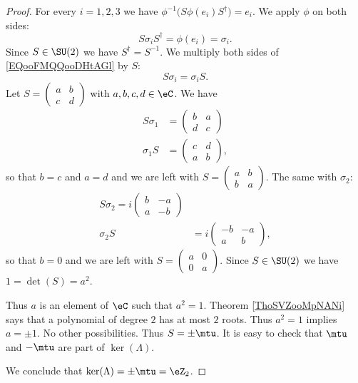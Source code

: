 \begin{proof}
	For every \( i=1,2,3\) we have \( \phi^{-1}\big( S\phi(e_i)S^{\dag} \big)=e_i\). We apply \( \phi\) on both sides:
	\begin{equation}        \label{EQooFMQQooDHtAGl}
		S\sigma_iS^{\dag}=\phi(e_i)=\sigma_i.
	\end{equation}
	Since \( S\in \SU(2)\) we have \( S^{\dag}=S^{-1}\). We multiply both sides of \eqref{EQooFMQQooDHtAGl} by \( S\):
	\begin{equation}
		S\sigma_i=\sigma_iS.
	\end{equation}
	Let \( S=\begin{pmatrix}
		a & b \\
		c & d
	\end{pmatrix}\) with \( a,b,c,d\in \eC\). We have
	\begin{subequations}
		\begin{align}
			S\sigma_1 & =\begin{pmatrix}
				             b & a \\
				             d & c
			             \end{pmatrix} \\
			\sigma_1S & =\begin{pmatrix}
				             c & d \\
				             a & b
			             \end{pmatrix},
		\end{align}
	\end{subequations}
	so that \( b=c\) and \( a=d\) and we are left with \( S=\begin{pmatrix}
		a & b \\
		b & a
	\end{pmatrix}\). The same with \( \sigma_2\):
	\begin{subequations}
		\begin{align}
			S\sigma_2=i\begin{pmatrix}
				           b & -a \\
				           a & -b
			           \end{pmatrix}    \\
			\sigma_2S & =i\begin{pmatrix}
				              -b & -a \\
				              a  & b
			              \end{pmatrix},
		\end{align}
	\end{subequations}
	so that \( b=0\) and we are left with \( S=\begin{pmatrix}
		a & 0 \\
		0 & a
	\end{pmatrix}\).
	Since \( S\in \SU(2)\) we have \( 1=\det(S)=a^2\).

	Thus \( a\) is an element of \( \eC\) such that \( a^2=1\). Theorem \ref{ThoSVZooMpNANi} says that a polynomial of degree \( 2\) has at most \( 2\) roots. Thus \( a^2=1\) implies \( a=\pm 1\). No other possibilities. Thus \( S=\pm\mtu\). It is easy to check that \( \mtu\) and \( -\mtu\) are part of \( \ker(\Lambda)\).

	We conclude that \( \ker(\Lambda)=\pm\mtu=\eZ_2\).
\end{proof}

